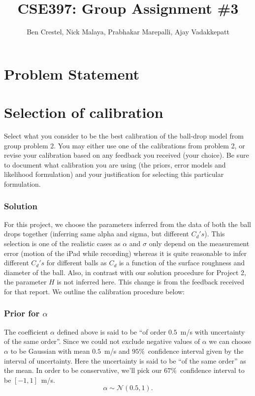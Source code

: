 \documentclass{article}
\begin{document}
\title{CSE397: Group Assignment \#3}
\author{Ben Crestel, Nick Malaya, Prabhakar Marepalli, Ajay Vadakkepatt}

\maketitle

\section*{Problem Statement}


\section{Selection of calibration}

Select what you consider to be the best calibration of the ball-drop
model from group problem 2. You may either use one of the calibrations
from problem 2, or revise your calibration based on any feedback you
received (your choice). Be sure to document what calibration you are
using (the priors, error models and likelihood formulation) and your
justification for selecting this particular formulation.


\subsubsection*{Solution}

For this project, we choose the parameters inferred from the data
of both the ball drops together (inferring same alpha and sigma, but
different $C_{d}'s$). This selection is one of the realistic cases
as $\alpha$ and $\sigma$ only depend on the measurement error (motion
of the iPad while recording) whereas it is quite reasonable to infer
different $C_{d}'s$ for different balls as $C_{d}$ is a function
of the surface roughness and diameter of the ball. Also, in contrast
with our solution procedure for Project 2, the parameter $H$ is not
inferred here. This change is from the feedback received for that
report. We outline the calibration procedure below:


\subsubsection*{Prior for $\alpha$}

The coefficient $\alpha$ defined above is said to be ``of order
$0.5$~m/s with uncertainty of the same order''. Since we could
not exclude negative values of $\alpha$ we can choose $\alpha$ to
be Gaussian with mean $0.5$~m/s and $95\%$~confidence interval
given by the interval of uncertainty. Here the uncertainty is said
to be ``of the same order'' as the mean. In order to be conservative,
we'll pick our $67\%$~confidence interval to be $[-1,1]$~m/s.
\[
\alpha\sim\mathcal{N}(0.5,1).
\]
\end{document}
